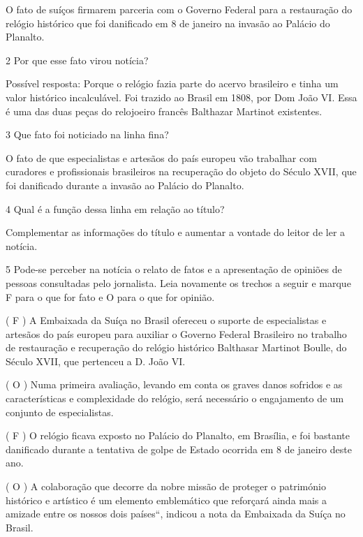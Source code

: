 \begin{itemize}
\begin{itemize}
O fato de suíços firmarem parceria com o Governo Federal para a
restauração do relógio histórico que foi danificado em 8 de janeiro na
invasão ao Palácio do Planalto.

\num{2} Por que esse fato virou notícia? 

Possível resposta: Porque o relógio fazia parte do acervo brasileiro e
tinha um valor histórico incalculável. Foi trazido ao Brasil em 1808,
por Dom João VI. Essa é uma das duas peças do relojoeiro francês
Balthazar Martinot existentes.~

\num{3} Que fato foi noticiado na linha fina? 

O fato de que especialistas e artesãos do país europeu vão trabalhar com
curadores e profissionais brasileiros na recuperação do objeto do Século
XVII, que foi danificado durante a invasão ao Palácio do Planalto.

\num{4} Qual é a função dessa linha em relação ao título?


Complementar as informações do título e aumentar a vontade do leitor de
ler a notícia.

\num{5} Pode-se perceber na notícia o relato de fatos e a apresentação
de opiniões de pessoas consultadas pelo jornalista. Leia novamente os
trechos a seguir e marque F para o que for fato e O para o que for
opinião.


( F ) A Embaixada da Suíça no Brasil ofereceu o suporte de especialistas
e artesãos do país europeu para auxiliar o Governo Federal Brasileiro no
trabalho de restauração e recuperação do relógio histórico Balthasar
Martinot Boulle, do Século XVII, que pertenceu a D. João VI.

( O ) Numa primeira avaliação, levando em conta os graves danos sofridos
e as características e complexidade do relógio, será necessário o
engajamento de um conjunto de especialistas.

( F ) O relógio ficava exposto no Palácio do Planalto, em Brasília, e
foi bastante danificado durante a tentativa de golpe de Estado ocorrida
em 8 de janeiro deste ano.

( O ) A colaboração que decorre da nobre missão de proteger o património
histórico e artístico é um elemento emblemático que reforçará ainda mais
a amizade entre os nossos dois países``, indicou a nota da Embaixada da
Suíça no Brasil.


\end{itemize}
\end{itemize}
